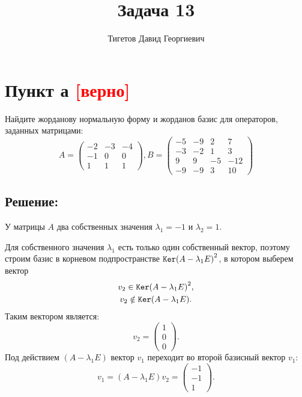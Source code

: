 \documentclass[12pt]{article}
\begin{document}
    \title{Задача 13}
    \author{Тигетов Давид Георгиевич}
    \date{}
    \maketitle

    \section*{Пункт а \textcolor{red}{[верно]}}
    Найдите жорданову нормальную форму и жорданов базис для операторов, заданных матрицами:
    \[
        A =
        \begin{pmatrix}
            -2 & -3 & -4 \\
            -1 & 0  & 0  \\
            1  & 1  & 1
        \end{pmatrix},
        B =
        \begin{pmatrix}
            -5 & -9 & 2  & 7   \\
            -3 & -2 & 1  & 3   \\
            9  & 9  & -5 & -12 \\
            -9 & -9 & 3  & 10
        \end{pmatrix}
    \]

    \subsection*{Решение:}
    У матрицы $A$ два собственных значения $\lambda_1 = -1$ и $\lambda_2 = 1$.

    Для собственного значения $\lambda_1$ есть только один собственный вектор, поэтому строим базис в корневом подпространстве $\mathtt{Ker}{\left ( A - \lambda_1 E \right)^2}$, в котором
    выберем вектор
    \begin{gather*}
        v_2 \in \mathtt{Ker}{\left ( A - \lambda_1 E \right)^2}, \\
        v_2 \notin \mathtt{Ker}{\left ( A - \lambda_1 E \right)}.
    \end{gather*}
    Таким вектором является:
    \[
        v_2 = \begin{pmatrix}
                  1 \\ 0 \\ 0
        \end{pmatrix}.
    \]
    Под действием $\left ( A - \lambda_1 E \right )$ вектор $v_1$ переходит во второй базисный вектор $v_1$:
    \[
        v_1
        = \left ( A - \lambda_1 E \right ) v_2
        = \begin{pmatrix}
              -1 \\ -1 \\ 1
        \end{pmatrix}.
    \]
\end{document}
